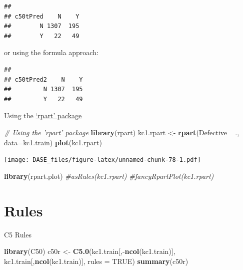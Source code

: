 \documentclass[]{book}
\newenvironment{Shaded}{\begin{snugshade}}{\end{snugshade}}
\newcommand{\KeywordTok}[1]{\textcolor[rgb]{0.13,0.29,0.53}{\textbf{{#1}}}}
\newcommand{\DataTypeTok}[1]{\textcolor[rgb]{0.13,0.29,0.53}{{#1}}}
\newcommand{\StringTok}[1]{\textcolor[rgb]{0.31,0.60,0.02}{{#1}}}
\newcommand{\CommentTok}[1]{\textcolor[rgb]{0.56,0.35,0.01}{\textit{{#1}}}}
\newcommand{\OtherTok}[1]{\textcolor[rgb]{0.56,0.35,0.01}{{#1}}}
\newcommand{\NormalTok}[1]{{#1}}
\begin{document}
\begin{verbatim}
##         
## c50tPred    N    Y
##        N 1307  195
##        Y   22   49
\end{verbatim}

or using the formula approach:

\begin{Shaded}
\end{Shaded}

\begin{verbatim}
##          
## c50tPred2    N    Y
##         N 1307  195
##         Y   22   49
\end{verbatim}

Using the
\href{https://cran.r-project.org/web/packages/rpart/index.html}{`rpart'
package}

\begin{Shaded}
\begin{Highlighting}[]
\CommentTok{# Using the 'rpart' package}
\KeywordTok{library}\NormalTok{(rpart)}
\NormalTok{kc1.rpart <-}\StringTok{ }\KeywordTok{rpart}\NormalTok{(Defective ~}\StringTok{ }\NormalTok{., }\DataTypeTok{data=}\NormalTok{kc1.train)}
\KeywordTok{plot}\NormalTok{(kc1.rpart)}
\end{Highlighting}
\end{Shaded}

\texttt{[image: DASE\_files/figure-latex/unnamed-chunk-78-1.pdf]}

\begin{Shaded}
\begin{Highlighting}[]
\KeywordTok{library}\NormalTok{(rpart.plot)}
\CommentTok{#asRules(kc1.rpart)}
\CommentTok{#fancyRpartPlot(kc1.rpart)}
\end{Highlighting}
\end{Shaded}

\section{Rules}\label{rules}

C5 Rules

\begin{Shaded}
\begin{Highlighting}[]
\KeywordTok{library}\NormalTok{(C50)}
\NormalTok{c50r <-}\StringTok{ }\KeywordTok{C5.0}\NormalTok{(kc1.train[,-}\KeywordTok{ncol}\NormalTok{(kc1.train)], kc1.train[,}\KeywordTok{ncol}\NormalTok{(kc1.train)], }\DataTypeTok{rules =} \OtherTok{TRUE}\NormalTok{)}
\KeywordTok{summary}\NormalTok{(c50r)}
\end{Highlighting}
\end{Shaded}
\end{document}
